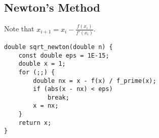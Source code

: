\subsection{Newton's Method}
Note that $x_{i+1}= x_i - \frac{f(x_i)}{f\prime(x_i)}$.
\begin{lstlisting}
double sqrt_newton(double n) {
    const double eps = 1E-15;
    double x = 1;
    for (;;) {
        double nx = x - f(x) / f_prime(x);
        if (abs(x - nx) < eps)
            break;
        x = nx;
    }
    return x;
}
\end{lstlisting}